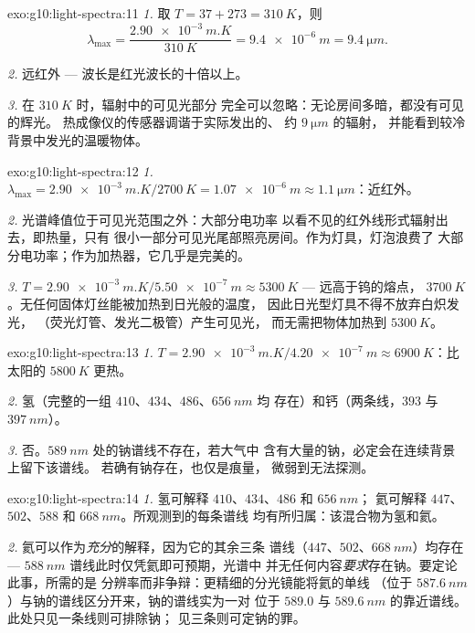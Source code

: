 \begin{solution}{exo:g10:light-spectra:11}
\emph{1.} 取 $T = 37 + 273 = \qty{310}{K}$，则
\[
\lambda_{\max} = \frac{\qty{2.90e-3}{m.K}}{\qty{310}{K}}
= \qty{9.4e-6}{m} = \qty{9.4}{\micro m}.
\]

\emph{2.} 远红外 ---
波长是红光波长的十倍以上。

\emph{3.} 在 $\qty{310}{K}$ 时，辐射中的可见光部分
完全可以忽略：无论房间多暗，都没有可见的辉光。
热成像仪的传感器调谐于实际发出的、
约 $\qty{9}{\micro m}$ 的辐射，
并能看到较冷背景中发光的温暖物体。
\end{solution}

\begin{solution}{exo:g10:light-spectra:12}
\emph{1.} $\lambda_{\max} = \qty{2.90e-3}{m.K} / \qty{2700}{K}
= \qty{1.07e-6}{m} \approx \qty{1.1}{\micro m}$：近红外。

\emph{2.} 光谱峰值位于可见光范围之外：大部分电功率
以看不见的红外线形式辐射出去，即热量，只有
很小一部分可见光尾部照亮房间。作为灯具，灯泡浪费了
大部分电功率；作为加热器，它几乎是完美的。

\emph{3.} $T = \qty{2.90e-3}{m.K} / \qty{5.50e-7}{m} \approx
\qty{5300}{K}$ --- 远高于钨的熔点，
$\qty{3700}{K}$。无任何固体灯丝能被加热到日光般的温度，
因此日光型灯具不得不放弃白炽发光，
（荧光灯管、发光二极管）产生可见光，
而无需把物体加热到 $\qty{5300}{K}$。
\end{solution}

\begin{solution}{exo:g10:light-spectra:13}
\emph{1.} $T = \qty{2.90e-3}{m.K} / \qty{4.20e-7}{m} \approx
\qty{6900}{K}$：比太阳的 $\qty{5800}{K}$ 更热。

\emph{2.} 氢（完整的一组 $410$、$434$、$486$、$\qty{656}{nm}$ 均
存在）和钙（两条线，$393$ 与 $\qty{397}{nm}$）。

\emph{3.} 否。$\qty{589}{nm}$ 处的钠谱线不存在，若大气中
含有大量的钠，必定会在连续背景上留下该谱线。
若确有钠存在，也仅是痕量，
微弱到无法探测。
\end{solution}

\begin{solution}{exo:g10:light-spectra:14}
\emph{1.} 氢可解释 $410$、$434$、$486$ 和 $\qty{656}{nm}$；
氦可解释 $447$、$502$、$588$ 和 $\qty{668}{nm}$。所观测到的每条谱线
均有所归属：该混合物为氢和氦。

\emph{2.} 氦可以作为\emph{充分}的解释，因为它的其余三条
谱线（$447$、$502$、$\qty{668}{nm}$）均存在 ---
$\qty{588}{nm}$ 谱线此时仅凭氦即可预期，光谱中
并无任何内容\emph{要求}存在钠。要定论此事，所需的是
分辨率而非争辩：更精细的分光镜能将氦的单线
（位于 $\qty{587.6}{nm}$）与钠的谱线区分开来，钠的谱线实为一对
位于 $589.0$ 与 $\qty{589.6}{nm}$ 的靠近谱线。此处只见一条线则可排除钠；
见三条则可定钠的罪。
\end{solution}

